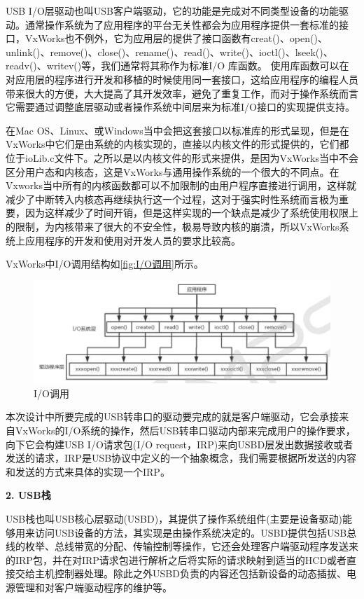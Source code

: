 	USB I/O层驱动也叫USB客户端驱动，它的功能是完成对不同类型设备的功能驱动。通常操作系统为了应用程序的平台无关性都会为应用程序提供一套标准的接口，VxWorks也不例外，它为应用层的提供了接口函数有creat()、open()、unlink()、remove()、close()、rename()、read()、write()、ioctl()、lseek()、readv()、writev()等\cite{陈洋2007VxWorks}\cite{Wu2008Implementation}\cite{Zhang2010Design}，我们通常将其称作为标准I/O 库函数。
	使用库函数可以在对应用层的程序进行开发和移植的时候使用同一套接口，这给应用程序的编程人员带来很大的方便，大大提高了其开发效率，避免了重复工作，而对于操作系统而言它需要通过调整底层驱动或者操作系统中间层来为标准I/O接口的实现提供支持。
	
	在Mac OS、Linux、或Windows当中会把这套接口以标准库的形式呈现，但是在VxWorks中它们是由系统的内核实现的，直接以内核文件的形式提供的，它们都位于ioLib.c文件下\cite{VxWorks内核解读}。之所以是以内核文件的形式来提供，是因为VxWorks当中不会区分用户态和内核态，这是VxWorks与通用操作系统的一个很大的不同点。在Vxworks当中所有的内核函数都可以不加限制的由用户程序直接进行调用，这样就减少了中断转入内核态再继续执行这一个过程，这对于强实时性系统而言极为重要，因为这样减少了时间开销，但是这样实现的一个缺点是减少了系统使用权限上的限制，为内核带来了很大的不安全性，极易导致内核的崩溃，所以VxWorks系统上应用程序的开发和使用对开发人员的要求比较高。
		
	VxWorks中I/O调用结构如\autoref{fig:I/O调用}所示。
	\begin{figure}[!h]
\centering
\includegraphics[width=1.0\textwidth]{./graphics/IOCall.pdf}
\caption{I/O调用}\label{fig:I/O调用}
\end{figure}
	
	
	本次设计中所要完成的USB转串口的驱动要完成的就是客户端驱动，它会承接来自VxWorks的I/O系统的操作，然后USB转串口驱动内部来完成用户的操作要求，向下它会构建USB I/O请求包(I/O request，IRP)来向USBD层发出数据接收或者发送的请求，IRP是USB协议中定义的一个抽象概念，我们需要根据所发送的内容和发送的方式来具体的实现一个IRP\cite{李雪红2004USB}。

\noindent \textbf{2. USB栈}
	
	USB栈也叫USB核心层驱动(USBD)，其提供了操作系统组件(主要是设备驱动)能够用来访问USB设备的方法，其实现是由操作系统决定的。USBD提供包括USB总线的枚举、总线带宽的分配、传输控制等操作，它还会处理客户端驱动程序发送来的IRP包，并在对IRP请求包进行解析之后将实际的请求映射到适当的HCD或者直接交给主机控制器处理。除此之外USBD负责的内容还包括新设备的动态插拔、电源管理和对客户端驱动程序的维护等。
	
